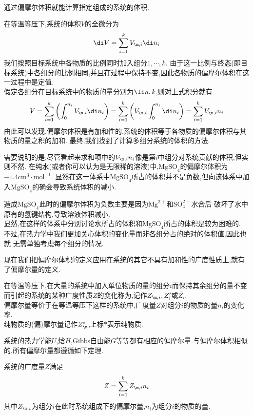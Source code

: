 \documentclass{ctexart}
\begin{document}
\indent 通过偏摩尔体积就能计算指定组成的系统的体积.
\begin{derivation}
    在等温等压下,系统的体积$V$的全微分为
    \[\di V=\sum_{i=1}^{k}V_{\m,i}\di n_i\]
    我们按照目标系统中各物质的比例同时加入组分$1,\cdots,k$.%
    由于这一比例与终态(即目标系统)中各组分的比例相同,并且在过程中保持不变,因此各物质的偏摩尔体积在这一过程中是定值.\\
    假定各组分在目标系统中的物质的量分别为$\li n,k$,则对上式积分就有
    \[V=\sum_{i=1}^{k}\left(\int_0^{n_i}V_{\m,i}\di n_i\right)
    =\sum_{i=1}^{k}\left(V_{\m,i}\int_0^{n_i}\di n_i\right)
    =\sum_{i=1}^{k}V_{\m,i}n_i\]
    由此可以发现,偏摩尔体积是有加和性的,系统的体积等于各物质的偏摩尔体积与其物质的量之积的加和.%
    最终,我们找到了计算多组分系统的体积的方法.
\end{derivation}
需要说明的是,尽管看起来求和项中的$V_{\m,i}n_i$像是第$i$中组分对系统贡献的体积,但实则不然.%
在纯水(或者你可以认为是无限稀的溶液)中,$\text{MgSO}_4$的偏摩尔体积为$-1.4\text{cm}^3\cdot\text{mol}^{-1}$.%
显然在这一体系中$\text{MgSO}_4$所占的体积并不是负数,但向该体系中加入$\text{MgSO}_4$的确会导致系统体积的减小.
\begin{hint}
造成$\text{MgSO}_4$此时的偏摩尔体积为负数主要是因为$\text{Mg}^{2+}$和$\text{SO}_4^{2-}$水合后%
破坏了水中原有的氢键结构,导致溶液体积减小.\\
显然,在这样的体系中分别讨论水所占的体积和$\text{MgSO}_4$所占的体积是较为困难的.%
不过,在热力学中我们更加关心体积的变化量而非各组分占的绝对的体积值,因此也就%
无需单独考虑每个组分的情况.
\end{hint}
\indent 现在我们把偏摩尔体积的定义应用在系统的其它不具有加和性的广度性质上,就有了偏摩尔量的定义.
\begin{definition}[4B.2.2 偏摩尔量]
    在等温等压下,在大量的系统中加入单位物质的量的组分$i$而保持其余组分的量不变而引起的系统的某种广度性质$Z$的变化称为,记作$Z_{\m,i},Z_{i}'$或$\overline{Z_i}$.\\
    偏摩尔量等价于在等温等压下这样的系统中,广度量$Z$对组分$i$的物质的量$n_i$的变化率.\\
    纯物质的(偏)摩尔量记作$Z_{\m}^\ast$,上标$\ast$表示纯物质.
\end{definition}
系统的热力学能$U$,焓$H$,Gibbs自由能$G$等等都有相应的偏摩尔量.与偏摩尔体积相似的,所有偏摩尔量都遵循如下定理.
\begin{theorem}[4B.2.3 偏摩尔量的加和公式]
    系统的广度量$Z$满足
    \[Z=\sum_{i=1}^kZ_{\m,i}n_i\]
    其中$Z_{\m,i}$为组分$i$在此时系统组成下的偏摩尔量,$n_i$为组分$i$的物质的量.
\end{theorem}
\end{document}
